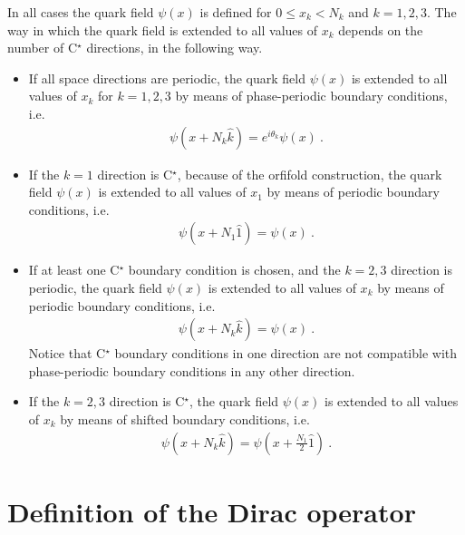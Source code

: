 \documentclass[11pt,fleqn]{article}
\begin{document}
In all cases the quark field $\psi(x)$ is defined for $0 \le x_k < N_k$ and $k=1,2,3$. The way in which the quark field is extended to all values of $x_k$ depends on the number of C$^\star$ directions, in the following way.
\begin{itemize}
   \item If all space directions are periodic, the quark field $\psi(x)$ is extended to all values of $x_k$ for $k=1,2,3$ by means of phase-periodic boundary conditions, i.e.
   \begin{gather}
      \psi(x+N_k \hat{k}) = e^{i \theta_k} \psi(x) \ .
   \end{gather}
   
   \item If the $k=1$ direction is C$^\star$, because of the orfifold construction, the quark field $\psi(x)$ is extended to all values of $x_1$ by means of periodic boundary conditions, i.e.
   \begin{gather}
      \psi(x+N_1 \hat{1}) = \psi(x) \ .
   \end{gather}
   
   \item If at least one C$^\star$ boundary condition is chosen, and the $k=2,3$ direction is periodic, the quark field $\psi(x)$ is extended to all values of $x_k$ by means of periodic boundary conditions, i.e.
   \begin{gather}
      \psi(x+N_k \hat{k}) = \psi(x) \ .
   \end{gather}
   Notice that C$^\star$ boundary conditions in one direction are not compatible with phase-periodic boundary conditions in any other direction.
   
   \item If the $k=2,3$ direction is C$^\star$, the quark field $\psi(x)$ is extended to all values of $x_k$ by means of shifted boundary conditions, i.e.
   \begin{gather}
      \psi(x+N_k \hat{k}) = \psi(x + \tfrac{N_1}{2} \hat{1}) \ .
   \end{gather}

\end{itemize}


\section{Definition of the Dirac operator}
\end{document}
